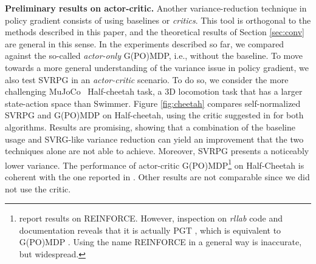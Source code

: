 \documentclass{article}
\makeatletter
\theoremstyle{remark}
\theoremstyle{definition}
\DeclareRobustCommand{\eg}{e.g.,\@\xspace}
\DeclareRobustCommand{\ie}{i.e.,\@\xspace}
\makeatother
\begin{document}

\textbf{Preliminary results on actor-critic.} %
Another variance-reduction technique in policy gradient consists of using baselines or \textit{critics}. This tool is orthogonal to the methods described in this paper, and the theoretical results of Section \ref{sec:conv} are general in this sense. In the experiments described so far, we compared against the so-called \textit{actor-only} G(PO)MDP, \ie without the baseline. To move towards a more general understanding of the variance issue in policy gradient, we also test SVRPG in an \textit{actor-critic} scenario. To do so, we consider the more challenging MuJoCo~\citep{todorov2012mujoco} Half-cheetah task, a 3D locomotion task that has a larger state-action space than Swimmer. Figure \ref{fig:cheetah} compares self-normalized SVRPG and G(PO)MDP on Half-cheetah, using the critic suggested in \cite{duan2016benchmarking} for both algorithms. Results are promising, showing that a combination of the baseline usage and SVRG-like variance reduction can yield an improvement that the two techniques alone are not able to achieve. Moreover, SVRPG presents a noticeably lower variance. The performance of actor-critic G(PO)MDP\footnote{\citet{duan2016benchmarking} report results on REINFORCE. However, inspection on \textit{rllab} code and documentation reveals that it is actually PGT \cite{sutton2000policy}, which is equivalent to G(PO)MDP \citep[shown by][]{peters2008reinforcement}. Using the name REINFORCE in a general way is inaccurate, but widespread.} on Half-Cheetah is coherent with the one reported in \cite{duan2016benchmarking}. Other results are not comparable since we did not use the critic. 
 

\vspace{-0.05in}
\end{document}
